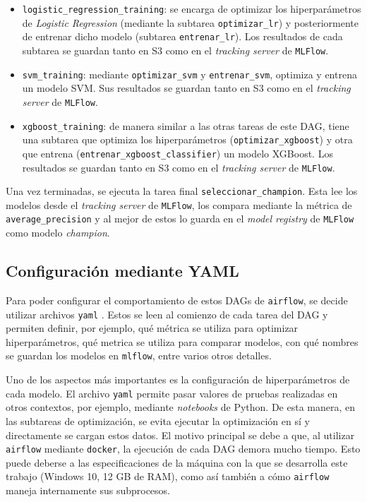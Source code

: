 \begin{itemize}
    \item \texttt{logistic\_regression\_training}: se encarga de optimizar los hiperparámetros de \textit{Logistic Regression} (mediante la subtarea \texttt{optimizar\_lr}) y posteriormente de entrenar dicho modelo (subtarea \texttt{entrenar\_lr}). Los resultados de cada subtarea se guardan tanto en S3 como en el \textit{tracking server} de \texttt{MLFlow}.
    \item \texttt{svm\_training}: mediante \texttt{optimizar\_svm} y \texttt{entrenar\_svm}, optimiza y entrena un modelo SVM. Sus resultados se guardan tanto en S3 como en el \textit{tracking server} de \texttt{MLFlow}.
    \item \texttt{xgboost\_training}: de manera similar a las otras tareas de este DAG, tiene una subtarea que optimiza los hiperparámetros (\texttt{optimizar\_xgboost}) y otra que entrena (\texttt{entrenar\_xgboost\_classifier}) un modelo XGBoost. Los resultados se guardan tanto en S3 como en el \textit{tracking server} de \texttt{MLFlow}.
\end{itemize}

Una vez terminadas, se ejecuta la tarea final \texttt{seleccionar\_champion}. Esta lee los modelos desde el \textit{tracking server} de \texttt{MLFlow}, los compara mediante la métrica de \texttt{average\_precision} y al mejor de estos lo guarda en el \textit{model registry} de \texttt{MLFlow} como modelo \textit{champion}.

\subsection{Configuración mediante YAML}

Para poder configurar el comportamiento de estos DAGs de \texttt{airflow}, se decide utilizar archivos \texttt{yaml} \citep{WEBSITE:yaml}. Estos se leen al comienzo de cada tarea del DAG y permiten definir, por ejemplo, qué métrica se utiliza para optimizar hiperparámetros, qué metrica se utiliza para comparar modelos, con qué nombres se guardan los modelos en \texttt{mlflow}, entre varios otros detalles.

Uno de los aspectos más importantes es la configuración de hiperparámetros de cada modelo. El archivo \texttt{yaml} permite pasar valores de pruebas realizadas en otros contextos, por ejemplo, mediante \textit{notebooks} de Python. De esta manera, en las subtareas de optimización, se evita ejecutar la optimización en sí y directamente se cargan estos datos. El motivo principal se debe a que, al utilizar \texttt{airflow} mediante \texttt{docker}, la ejecución de cada DAG demora mucho tiempo. Esto puede deberse a las especificaciones de la máquina con la que se desarrolla este trabajo (Windows 10, 12 GB de RAM), como así también a cómo \texttt{airflow} maneja internamente sus subprocesos.

